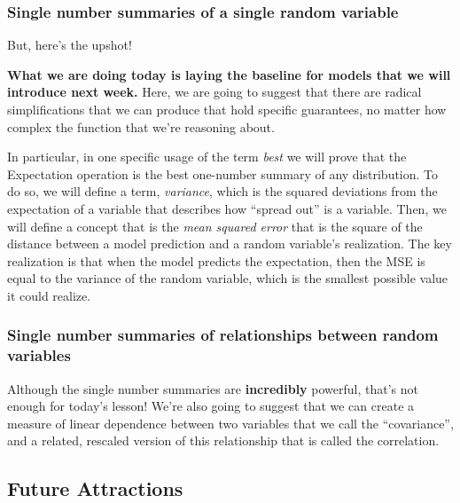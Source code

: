 \documentclass[
]{book}
\theoremstyle{definition}
\theoremstyle{definition}
\theoremstyle{definition}
\theoremstyle{definition}
\theoremstyle{remark}
\begin{document}
\hypertarget{single-number-summaries-of-a-single-random-variable}{%
\subsubsection{Single number summaries of a single random variable}\label{single-number-summaries-of-a-single-random-variable}}

But, here's the upshot!

\textbf{What we are doing today is laying the baseline for models that we will introduce next week.} Here, we are going to suggest that there are radical simplifications that we can produce that hold specific guarantees, no matter how complex the function that we're reasoning about.

In particular, in one specific usage of the term \emph{best} we will prove that the Expectation operation is the best one-number summary of any distribution. To do so, we will define a term, \emph{variance}, which is the squared deviations from the expectation of a variable that describes how ``spread out'' is a variable. Then, we will define a concept that is the \emph{mean squared error} that is the square of the distance between a model prediction and a random variable's realization. The key realization is that when the model predicts the expectation, then the MSE is equal to the variance of the random variable, which is the smallest possible value it could realize.

\hypertarget{single-number-summaries-of-relationships-between-random-variables}{%
\subsubsection{Single number summaries of relationships between random variables}\label{single-number-summaries-of-relationships-between-random-variables}}

Although the single number summaries are \textbf{incredibly} powerful, that's not enough for today's lesson! We're also going to suggest that we can create a measure of linear dependence between two variables that we call the ``covariance'', and a related, rescaled version of this relationship that is called the correlation.

\hypertarget{future-attractions}{%
\subsection{Future Attractions}\label{future-attractions}}
\end{document}

